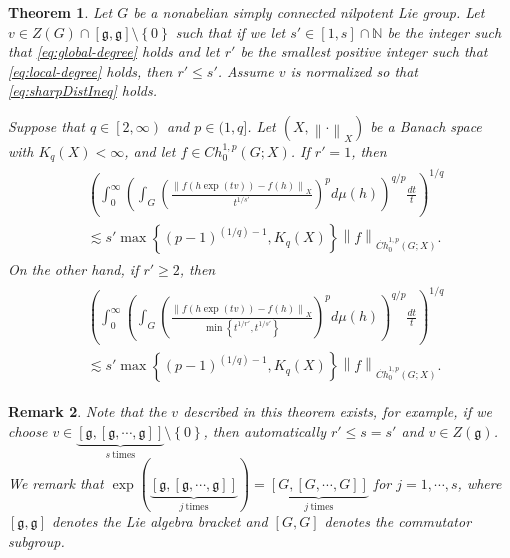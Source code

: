 \documentclass[11pt,reqno]{amsart}
\newtheorem{theorem}{Theorem}
\newtheorem{remark}[theorem]{Remark}
\newcommand{\1}{\mathbf 1}
\begin{document}
\begin{theorem}\label{thm:nilpotentVvsH}
Let $G$ be a nonabelian simply connected nilpotent Lie group. Let $v\in Z\left(G\right)\cap\left[\mathfrak{g},\mathfrak{g}\right]\setminus \left\{0\right\}$ such that if we let $s'\in \left[1,s\right]\cap \mathbb{N}$ be the integer such that \eqref{eq:global-degree} holds and let $r'$ be the smallest positive integer such that \eqref{eq:local-degree} holds, then $r'\le s'$. Assume $v$ is normalized so that \eqref{eq:sharpDistIneq} holds.

Suppose that $q\in \left[2,\infty\right)$ and $p\in (1,q]$. Let $\left(X,\left\|\cdot\right\|_X\right)$ be a Banach space with $K_q\left(X\right)<\infty$, and let $f\in Ch_0^{1,p}\left(G;X\right)$. If $r'=1$, then
\begin{align}\label{eq:nilpotentVvsH-r'=1}
\begin{aligned}
&\left(\int_0^\infty \left(\int_{G}\left(\frac{\left\|f\left(h\exp\left(tv\right)\right)-f\left(h\right)\right\|_X}{t^{1/s'}}\right)^pd\mu\left(h\right)\right)^{q/p}\frac{dt}{t}\right)^{1/q}\\
&\lesssim s'\max\left\{\left(p-1\right)^{(1/q)-1},K_q\left(X\right)\right\} \left\|f\right\|_{\dot{Ch}_0^{1,p}\left(G;X\right)}.
\end{aligned}
\end{align}
On the other hand, if $r'\ge 2$, then
\begin{align}\label{eq:nilpotentVvsH-r'>1}
\begin{aligned}
&\left(\int_0^\infty \left(\int_{G}\left(\frac{\left\|f\left(h\exp\left(tv\right)\right)-f\left(h\right)\right\|_X}{\min\left\{t^{1/r'},t^{1/s'}\right\}}\right)^pd\mu\left(h\right)\right)^{q/p}\frac{dt}{t}\right)^{1/q}\\
&\lesssim s'\max\left\{\left(p-1\right)^{(1/q)-1},K_q\left(X\right)\right\} \left\|f\right\|_{\dot{Ch}_0^{1,p}\left(G;X\right)}.
\end{aligned}
\end{align}
\end{theorem}

\begin{remark}
Note that the $v$ described in this theorem exists, for example, if we choose $v\in \underbrace{\left[\mathfrak{g},\left[\mathfrak{g},\cdots,\mathfrak{g}\right]\right]}_{s\mathrm{~times}}\setminus\left\{0\right\}$, then automatically $r'\le s=s'$ and $v\in Z\left(\mathfrak{g}\right)$. We remark that $\exp\left(\underbrace{\left[\mathfrak{g},\left[\mathfrak{g},\cdots,\mathfrak{g}\right]\right]}_{j\mathrm{~times}}\right)=\underbrace{\left[G,\left[G,\cdots,G\right]\right]}_{j\mathrm{~times}}$ for $j=1,\cdots,s$, where $\left[\mathfrak{g},\mathfrak{g}\right]$ denotes the Lie algebra bracket and $\left[G,G\right]$ denotes the commutator subgroup.
\end{remark}
\end{document}
